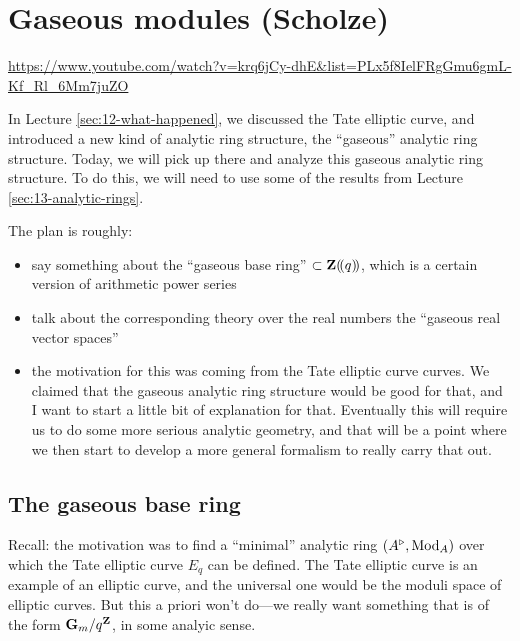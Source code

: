 
\section{\ufs Gaseous modules (Scholze)}
\label{sec:14-gaseous}

\url{https://www.youtube.com/watch?v=krq6jCy-dhE&list=PLx5f8IelFRgGmu6gmL-Kf_Rl_6Mm7juZO}
\renewcommand{\yt}[2]{\href{https://www.youtube.com/watch?v=krq6jCy-dhE&list=PLx5f8IelFRgGmu6gmL-Kf_Rl_6Mm7juZO&t=#1}{#2}}
\vspace{1em}

In Lecture \ref{sec:12-what-happened}, we discussed the Tate elliptic curve, and introduced a new kind of analytic ring structure, the ``gaseous'' analytic ring structure. Today, we will pick up there and analyze this gaseous analytic ring structure. To do this, we will need to use some of the results from Lecture \ref{sec:13-analytic-rings}.

The plan is roughly:
\begin{itemize}
  \item say something about the ``gaseous base ring'' $\subset\mathbf Z(\!(q)\!)$, which is a certain version of arithmetic power series
  \item talk about the corresponding theory over the real numbers the ``gaseous real vector spaces''
  \item the motivation for this was coming from the Tate elliptic curve curves. We claimed that the gaseous analytic ring structure would be good for that, and I want to start a little bit of explanation for that. Eventually this will require us to do some more serious analytic geometry, and that will be a point where we then start to develop a more general formalism to really carry that out.
\end{itemize}

\subsection{\ufs The gaseous base ring}
Recall: the motivation was to find a ``minimal'' analytic ring $(A^\triangleright,\operatorname{Mod}_A)$ over which the Tate elliptic curve $E_q$ can be defined. The Tate elliptic curve is an example of an elliptic curve, and the universal one would be the moduli space of elliptic curves. But this a priori won't do---we really want something that is of the form $\mathbf G_m/q^\mathbf Z$, in some analyic sense.

